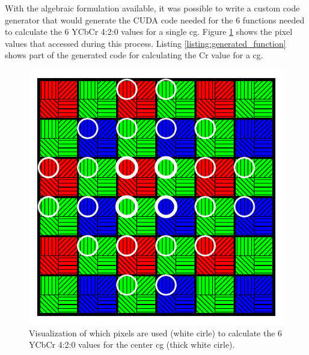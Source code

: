 \begin{table}[H]
    \begin{minipage}[b]{.5\linewidth}
    \end{minipage}
    \caption{Comparison of the number of \gls{fma} operations required to get the desired output.}
    \label{table:debayer_coefficients}
\end{table}

With the algebraic formulation available, it was possible to write a custom code generator that would generate the CUDA code needed for the 6 functions needed to calculate the 6 YCbCr 4:2:0 values for a single \gls{cg}.
Figure \ref{fig:transformation} shows the pixel values that accessed during this process.
Listing \ref{listing:generated_function} shows part of the generated code for calculating the Cr value for a \gls{cg}.

\begin{figure}[H]
    \centering
    \includegraphics[width=.4\textwidth]{figures/polarized_image/normal_conv.pdf}
    \caption{Visualization of which pixels are used (white cirle) to calculate the 6 YCbCr 4:2:0 values for the center \gls{cg} (thick white cirle).}
    \label{fig:transformation}
\end{figure}

